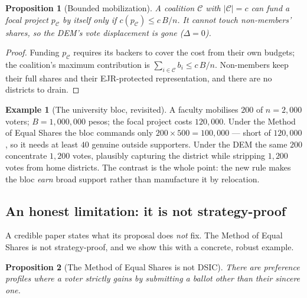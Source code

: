 \documentclass[11pt,letterpaper]{article}
\theoremstyle{definition}
\newtheorem{example}{Example}[section]
\theoremstyle{plain}
\newtheorem{proposition}{Proposition}[section]
\theoremstyle{remark}
\newcommand{\budget}{B}
\newcommand{\cost}{c}
\begin{document}
\begin{proposition}[Bounded mobilization]
\label{prop:mes-mob}
A coalition $\mathcal{C}$ with $|\mathcal{C}|=c$ can fund a focal project $p_\mathcal{C}$
\emph{by itself} only if $\cost(p_\mathcal{C})\le c\,\budget/n$. It cannot touch non-members'
shares, so the DEM's vote displacement is gone ($\Delta=0$).
\end{proposition}
\begin{proof}
Funding $p_\mathcal{C}$ requires its backers to cover the cost from their own budgets; the
coalition's maximum contribution is $\sum_{i\in\mathcal{C}}b_i\le c\,\budget/n$. Non-members keep
their full shares and their EJR-protected representation, and there are no districts to drain.
\end{proof}

\begin{example}[The university bloc, revisited]
A faculty mobilises $200$ of $n=2{,}000$ voters; $\budget=1{,}000{,}000$ pesos; the focal project
costs $120{,}000$. Under the Method of Equal Shares the bloc commands only $200\times500=100{,}000$
--- short of $120{,}000$, so it needs at least $40$ genuine outside supporters. Under the DEM the same
$200$ concentrate $1{,}200$ votes, plausibly capturing the district while stripping $1{,}200$ votes
from home districts. The contrast is the whole point: the new rule makes the bloc \emph{earn} broad
support rather than manufacture it by relocation.
\end{example}

\subsection{An honest limitation: it is not strategy-proof}

A credible paper states what its proposal does \emph{not} fix. The Method of Equal Shares is not
strategy-proof, and we show this with a concrete, robust example.

\begin{proposition}[The Method of Equal Shares is not DSIC]
\label{prop:sp}
There are preference profiles where a voter strictly gains by submitting a ballot other than their
sincere one.
\end{proposition}
\end{document}
